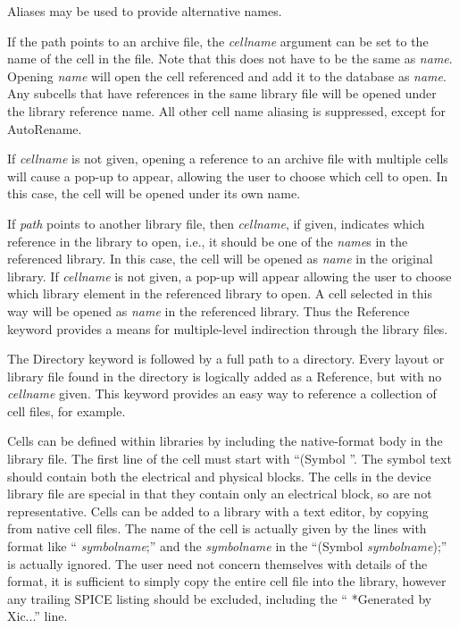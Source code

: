 Aliases may be used to provide alternative names.

If the path points to an archive file, the {\it cellname} argument can
be set to the name of the cell in the file.  Note that this does not
have to be the same as {\it name}.  Opening {\it name} will open the
cell referenced and add it to the database as {\it name}.  Any
subcells that have references in the same library file will be opened
under the library reference name.  All other cell name aliasing is
suppressed, except for {\et AutoRename}.

If {\it cellname} is not given, opening a reference to an archive file
with multiple cells will cause a pop-up to appear, allowing the user
to choose which cell to open.  In this case, the cell will be opened
under its own name.

If {\it path} points to another library file, then {\it cellname}, if
given, indicates which reference in the library to open, i.e., it
should be one of the {\it name\/}s in the referenced library.  In this
case, the cell will be opened as {\it name} in the original library. 
If {\it cellname} is not given, a pop-up will appear allowing the user
to choose which library element in the referenced library to open.  A
cell selected in this way will be opened as {\it name} in the
referenced library.  Thus the {\vt Reference} keyword provides a means
for multiple-level indirection through the library files.

The {\vt Directory} keyword is followed by a full path to a directory. 
Every layout or library file found in the directory is logically added
as a {\vt Reference}, but with no {\it cellname} given.  This keyword
provides an easy way to reference a collection of cell files, for
example.

Cells can be defined within libraries by including the native-format
body in the library file.  The first line of the cell must start with
``{\vt (Symbol }''.  The symbol text should contain both the
electrical and physical blocks.  The cells in the device library
file are special in that they contain only an electrical block, so are
not representative.  Cells can be added to a library with a text
editor, by copying from native cell files.  The name of the cell is
actually given by the lines with format like ``{} {\it
symbolname\/};'' and the {\it symbolname} in the ``{\vt (Symbol} {\it
symbolname\/}{\vt );}'' is actually ignored.  The user need not
concern themselves with details of the format, it is sufficient to
simply copy the entire {\Xic} cell file into the library, however any
trailing SPICE listing should be excluded, including the ``{\vt
*Generated by Xic}...'' line.

